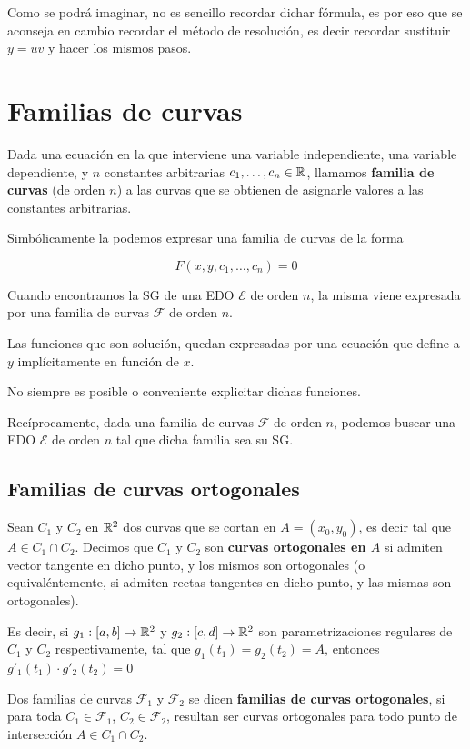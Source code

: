 Como se podrá imaginar, no es sencillo recordar dichar fórmula, es por eso que se aconseja en cambio recordar el método de resolución, es decir recordar sustituir $ y = uv$ y hacer los mismos pasos.

\section{Familias de curvas}

\begin{definition}

Dada una ecuación en la que interviene una variable independiente, una variable dependiente, y $n$ constantes arbitrarias $ c_1, \ldots, c_n \in \mathbb{R}$, llamamos \textbf{familia de curvas}  (de orden $n$) a las curvas que se obtienen de asignarle valores a las constantes arbitrarias.

Simbólicamente la podemos expresar una familia de curvas de la forma

$$ F(x,y,c_1,\ldots, c_n) = 0 $$

\end{definition}

Cuando encontramos la SG de una EDO $\mathcal{E}$ de orden $n$, la misma viene expresada por una familia de curvas $\mathcal{F}$ de orden $n$.

Las funciones que son solución, quedan expresadas por una ecuación que define a $y$ implícitamente en función de $x$. 

No siempre es posible o conveniente explicitar dichas funciones.

Recíprocamente, dada una familia de curvas $\mathcal{F}$ de orden $n$, podemos buscar una EDO $\mathcal{E}$ de orden $n$ tal que dicha familia sea su SG.

\subsection{Familias de curvas ortogonales}

\begin{definition}

Sean $C_1$ y $C_2$ en $\mathbb{R}^2$ dos curvas que se cortan en $A = (x_0, y_0)$, es decir tal que $A \in C_1 \cap C_2$.  Decimos que $C_1$ y $C_2$ son \textbf{curvas ortogonales en $A$} si admiten vector tangente en dicho punto, y los mismos son ortogonales (o equivaléntemente, si admiten rectas tangentes en dicho punto, y las mismas son ortogonales).

Es decir, si $g_1 : [a,b] \to \mathbb{R}^2$ y $g_2 : [c,d] \to \mathbb{R}^2$ son parametrizaciones regulares de $C_1$ y $C_2$ respectivamente, tal que $g_1(t_1) = g_2(t_2) = A$, entonces $ g'_1(t_1) \cdot g'_2(t_2) = 0$

Dos familias de curvas $\mathcal{F}_1$ y $\mathcal{F}_2$ se dicen \textbf{familias de curvas ortogonales},  si para toda $C_1 \in \mathcal{F}_1$, $C_2 \in \mathcal{F}_2$, resultan ser curvas ortogonales para todo punto de intersección $A \in C_1 \cap C_2$.
\end{definition}

